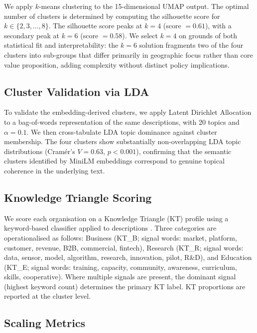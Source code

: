 \documentclass[review,12pt]{elsarticle}
\begin{document}
We apply $k$-means clustering \citep{lloyd1982least} to the
15-dimensional UMAP output. The optimal number of clusters is
determined by computing the silhouette score
\citep{rousseeuw1987silhouettes} for $k \in \{2, 3, \ldots, 8\}$.
The silhouette score peaks at $k = 4$ (score $= 0.61$), with a
secondary peak at $k = 6$ (score $= 0.58$). We select $k = 4$ on
grounds of both statistical fit and interpretability: the $k = 6$
solution fragments two of the four clusters into sub-groups that
differ primarily in geographic focus rather than core value
proposition, adding complexity without distinct policy implications.

\subsection{Cluster Validation via LDA}

To validate the embedding-derived clusters, we apply Latent
Dirichlet Allocation \citep{blei2003latent} to a bag-of-words
representation of the same descriptions, with 20 topics and
$\alpha = 0.1$. We then cross-tabulate LDA topic dominance against
cluster membership. The four clusters show substantially
non-overlapping LDA topic distributions (Cram\'{e}r's $V = 0.63$,
$p < 0.001$), confirming that the semantic clusters identified by
MiniLM embeddings correspond to genuine topical coherence in the
underlying text.

\subsection{Knowledge Triangle Scoring}

We score each organisation on a Knowledge Triangle (KT) profile
using a keyword-based classifier applied to descriptions
\citep{etzkowitz2000dynamics, maass2018data}. Three categories
are operationalised as follows: Business (KT\_B; signal words:
market, platform, customer, revenue, B2B, commercial, fintech),
Research (KT\_R; signal words: data, sensor, model, algorithm,
research, innovation, pilot, R\&D), and Education (KT\_E; signal
words: training, capacity, community, awareness, curriculum, skills,
cooperative). Where multiple signals are present, the dominant
signal (highest keyword count) determines the primary KT label.
KT proportions are reported at the cluster level.

\subsection{Scaling Metrics}
\end{document}
